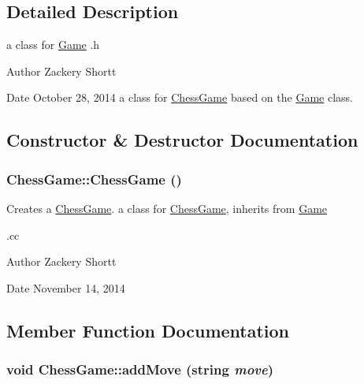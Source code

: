 \subsection{Detailed Description}
a class for \hyperlink{classGame}{Game} .h \begin{DoxyAuthor}{Author}
Zackery Shortt 
\end{DoxyAuthor}
\begin{DoxyDate}{Date}
October 28, 2014 a class for \hyperlink{classChessGame}{ChessGame} based on the \hyperlink{classGame}{Game} class. 
\end{DoxyDate}


\subsection{Constructor \& Destructor Documentation}
\hypertarget{classChessGame_a7c9d1caa97c7ca5737f187a6066662b2}{
\subsubsection[{ChessGame}]{\setlength{\rightskip}{0pt plus 5cm}ChessGame::ChessGame ()}}
\label{classChessGame_a7c9d1caa97c7ca5737f187a6066662b2}


Creates a \hyperlink{classChessGame}{ChessGame}. a class for \hyperlink{classChessGame}{ChessGame}, inherits from \hyperlink{classGame}{Game}

.cc \begin{DoxyAuthor}{Author}
Zackery Shortt 
\end{DoxyAuthor}
\begin{DoxyDate}{Date}
November 14, 2014 
\end{DoxyDate}


\subsection{Member Function Documentation}
\hypertarget{classChessGame_ae91e34d3cff8c49c243d2a5f6164b4b6}{
\subsubsection[{addMove}]{\setlength{\rightskip}{0pt plus 5cm}void ChessGame::addMove (string {\em move})}}
\label{classChessGame_ae91e34d3cff8c49c243d2a5f6164b4b6}


